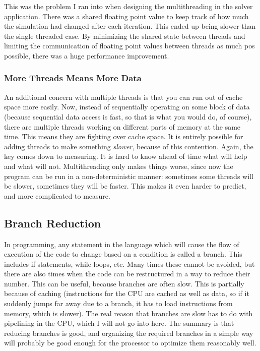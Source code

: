 This was the problem I ran into when designing the multithreading in the solver application. There was a shared floating point value
to keep track of how much the simulation had changed after each iteration. This ended up being slower than the single threaded case.
By minimizing the shared state between threads and limiting the communication of floating point values between threads as much pos
possible, there was a huge performance improvement.

\subsubsection{More Threads Means More Data}

An additional concern with multiple threads is that you can run out of cache space more easily. Now, instead of sequentially operating
on some block of data (because sequential data access is fast, so that is what you would do, of course), there are multiple threads
working on different parts of memory at the same time. This means they are fighting over cache space. It is entirely possible for
adding threads to make something \textit{slower}, because of this contention. Again, the key comes down to measuring. It is hard to
know ahead of time what will help and what will not. Multithreading only makes things worse, since now the program can be run in a
non-deterministic manner: sometimes some threads will be slower, sometimes they will be faster. This makes it even harder to predict,
and more complicated to measure.

\subsection{Branch Reduction}

In programming, any statement in the language which will cause the flow of execution of the code to change based on a condition
is called a branch. This includes if statements, while loops, etc. Many times these cannot be avoided, but there are also
times when the code can be restructured in a way to reduce their number. This can be useful, because branches are often slow.
This is partially because of caching (instructions for the CPU are cached as well as data, so if it suddenly jumps far away due
to a branch, it has to load instructions from memory, which is slower). The real reason that branches are slow has to do with
pipelining in the CPU, which I will not go into here. The summary is that reducing branches is good, and organizing the required
branches in a simple way will probably be good enough for the processor to optimize them reasonably well.

